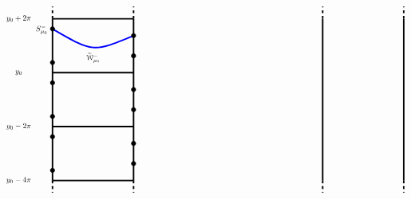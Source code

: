 \documentclass[11 pt]{article}
\renewcommand\({\left(}
\renewcommand\){\right)}
\newcommand\wt{\widetilde}
\newcommand\<{\langle}
\renewcommand\>{\rangle}
\newcommand\8{\infty}
\newcommand{\mc}{\mathcal}
\begin{document}
\begin{figure}[h]
\[
\begin{tikzpicture}[scale = 0.50]

\draw[ultra thick] (-13,-6) -- (-13, 6);
\draw[ultra thick] (-7,-6) -- (-7,6);

\draw[ultra thick, dashed] (-13,6) -- (-13,6.9);
\draw[ultra thick, dashed] (-7,6) -- (-7,6.9);
\draw[ultra thick, dashed] (-13,-6) -- (-13,-6.9);
\draw[ultra thick, dashed] (-7,-6) -- (-7,-6.9);

\draw[ultra thick] (-13,-2) -- (-7,-2);
\draw[ultra thick] (-13,2) -- (-7,2);
\draw[ultra thick] (-13,-6) -- (-7,-6);
\draw[ultra thick] (-13,6) -- (-7,6);



\draw [ ultra thick, blue] (-13,5.25) .. controls (-10,3.5) .. (-7,4.75);

\draw (-10,3.1) node [scale = .75] {$\wt{\mc{W}}^-_{\mu_0}$};



\node [scale = .50] [circle, draw, fill = black] at (-13,-1.25)  {};
\node [scale = .50] [circle, draw, fill = black] at (-13,1.25)  {};
\node [scale = .50] [circle, draw, fill = black] at (-7,-.75)  {};
\node [scale = .50] [circle, draw, fill = black] at (-7,.75)  {};

\node [scale = .50] [circle, draw, fill = black] at (-13,-5.25)  {};
\node [scale = .50] [circle, draw, fill = black] at (-13,-2.75)  {};
\node [scale = .50] [circle, draw, fill = black] at (-7,-4.75)  {};
\node [scale = .50] [circle, draw, fill = black] at (-7,-3.25)  {};

\node [scale = .50] [circle, draw, fill = black] at (-13,2.75)  {};
\node [scale = .50] [circle, draw, fill = black] at (-13,5.25)  {};
\node [scale = .50] [circle, draw, fill = black] at (-7,3.25)  {};
\node [scale = .50] [circle, draw, fill = black] at (-7,4.75)  {};


\draw (-13.8,5.2) node [scale = .8] {$S^-_{\mu_0}$};

\draw (-15.5,2) node [scale = .8] {$y_0$};
\draw (-15.5,6) node [scale = .8] {$y_0 + 2\pi$};
\draw (-15.5,-2) node [scale = .8] {$y_0 - 2\pi$};
\draw (-15.5,-6) node [scale = .8] {$y_0 - 4\pi$};


\draw[ultra thick] (13,-6) -- (13, 6);
\draw[ultra thick] (7,-6) -- (7,6);

\draw[ultra thick, dashed] (13,6) -- (13,6.9);
\draw[ultra thick, dashed] (7,6) -- (7,6.9);
\draw[ultra thick, dashed] (13,-6) -- (13,-6.9);
\draw[ultra thick, dashed] (7,-6) -- (7,-6.9);


\end{tikzpicture}\]
\end{figure}
\end{document}
